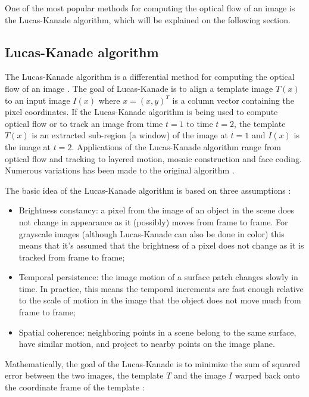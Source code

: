 \documentclass[msc, a4paper, classic, en]{ufbathesis}
\begin{document}
One of the most popular methods for computing the optical flow of an image is the Lucas-Kanade algorithm, which will be explained on the following section.

\subsection{Lucas-Kanade algorithm}
\label{sec:lucas}

The Lucas-Kanade \cite{lk} algorithm is a differential method for computing the optical flow of an image \cite{kinectkanade}. The goal of Lucas-Kanade is to align a template image $T(x)$ to an input image $I(x)$ where $x = (x, y)^T$ is a column vector containing the pixel coordinates. If the Lucas-Kanade algorithm is being used to compute optical flow or to track an image from time $t = 1$ to time $t = 2$, the template $T(x)$ is an extracted sub-region (a window) of the image at $t = 1$ and $I(x)$ is the image at $t = 2$. Applications of the Lucas-Kanade algorithm range from optical flow and tracking to layered motion, mosaic construction and face coding. Numerous variations has been made to the original algorithm \cite{lk20}.

The basic idea of the Lucas-Kanade algorithm is based on three assumptions \cite{bradski2008learning}:

\begin{itemize}
  \item Brightness constancy: a pixel from the image of an object in the scene does not change in appearance as it (possibly) moves from frame to frame. For grayscale images (although Lucas-Kanade can also be done in color) this means that it's assumed that the brightness of a pixel does not change as it is tracked from frame to frame;
  \item Temporal persistence: the image motion of a surface patch changes slowly in time. In practice, this means the temporal increments are fast enough relative to the scale of motion in the image that the object does not move much from frame to frame;
  \item Spatial coherence: neighboring points in a scene belong to the same surface, have similar motion, and project to nearby points on the image plane.
\end{itemize}

Mathematically, the goal of the Lucas-Kanade is to minimize the sum of squared error between the two images, the template $T$ and the image $I$ warped back onto the coordinate frame of the template \cite{lk20}:
\end{document}
